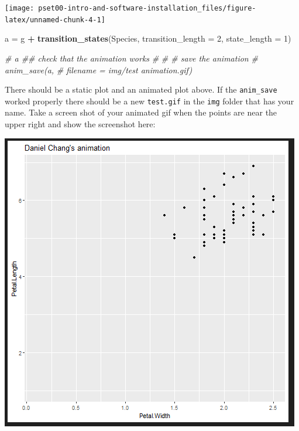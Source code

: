 \documentclass[
]{article}
\newenvironment{Shaded}{\begin{snugshade}}{\end{snugshade}}
\newcommand{\AttributeTok}[1]{\textcolor[rgb]{0.13,0.29,0.53}{#1}}
\newcommand{\CommentTok}[1]{\textcolor[rgb]{0.56,0.35,0.01}{\textit{#1}}}
\newcommand{\DecValTok}[1]{\textcolor[rgb]{0.00,0.00,0.81}{#1}}
\newcommand{\FunctionTok}[1]{\textcolor[rgb]{0.13,0.29,0.53}{\textbf{#1}}}
\newcommand{\NormalTok}[1]{#1}
\newcommand{\OtherTok}[1]{\textcolor[rgb]{0.56,0.35,0.01}{#1}}
\newcommand{\SpecialCharTok}[1]{\textcolor[rgb]{0.81,0.36,0.00}{\textbf{#1}}}
\begin{document}
\begin{center}\texttt{[image: pset00-intro-and-software-installation\_files/figure-latex/unnamed-chunk-4-1]} \end{center}

\begin{Shaded}
\begin{Highlighting}[]
\NormalTok{a }\OtherTok{=}\NormalTok{ g }\SpecialCharTok{+} 
  \FunctionTok{transition\_states}\NormalTok{(Species,}
                    \AttributeTok{transition\_length =} \DecValTok{2}\NormalTok{,}
                    \AttributeTok{state\_length =} \DecValTok{1}\NormalTok{)}

\CommentTok{\# a  \#\# check that the animation works}
\CommentTok{\# }
\CommentTok{\# \# save the animation}
\CommentTok{\# anim\_save(a,}
\CommentTok{\#           filename = \textquotesingle{}img/test animation.gif\textquotesingle{})}
\end{Highlighting}
\end{Shaded}

There should be a static plot and an animated plot above. If the
\texttt{anim\_save} worked properly there should be a new
\texttt{test.gif} in the \texttt{img} folder that has your name. Take a
screen shot of your animated gif when the points are near the upper
right and show the screenshot here:

\includegraphics{img/snip of test.png}
\end{document}
